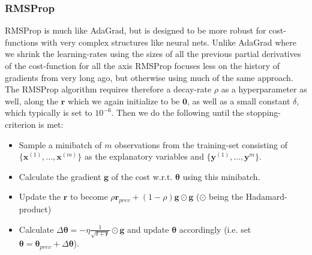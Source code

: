 \documentclass{article}
\begin{document}
\subsubsection{RMSProp}
RMSProp is much like AdaGrad, but is designed to be more robust for
cost-functions with very complex structures like neural nets. Unlike AdaGrad
where we shrink the learning-rates using the sizes of all the previous partial
derivatives of the cost-function for all the axis RMSProp focuses less on the
history of gradients from very long ago, but otherwise using much of the same
approach. The RMSProp algorithm requires therefore a decay-rate $\rho$ as a
hyperparameter as well, along the $\bm{r}$ which we again initialize to be
$\bm{0}$, as well as a small constant $\delta$, which typically is set to
$10^{-6}$. Then we do the following until the stopping-criterion is met:
\begin{itemize}
    \item Sample a minibatch of $m$ observations from the training-set
          consisting of $\{\bm{x}^{(1)}, \dots, \bm{x}^{(m)}\}$ as the explanatory
          variables and $\{\bm{y}^{(1)}, \dots, \bm{y}^{m}\}$.
    \item Calculate the gradient $\bm{g}$ of the cost w.r.t. $\bm{\theta}$ using
          this minibatch.
    \item Update the $\bm{r}$ to become $\rho \bm{r}_{prev} + (1 - \rho) \bm{g} \odot \bm{g}$
          ($\odot$ being the Hadamard-product)
    \item Calculate $\Delta \bm{\theta} = -\eta \frac{1}{\sqrt{\delta + \bm{r}}}
              \odot \bm{g}$ and update $\bm{\theta}$ accordingly (i.e. set $\bm{\theta} =
              \bm{\theta}_{prev} + \Delta \bm{\theta}$).
\end{itemize}
\end{document}
